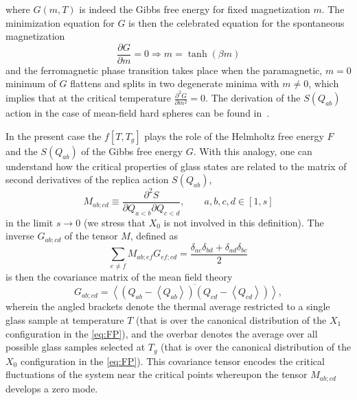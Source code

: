 \documentclass[aps,pnas,float]{revtex4}
\begin{document}
where $G(m,T)$ is indeed the Gibbs free energy for fixed magnetization $m$. The minimization equation for $G$ is then the celebrated equation for the spontaneous magnetization
\begin{equation}
 \frac{\partial G}{\partial m} = 0 \Longrightarrow m = \tanh(\beta m)
\end{equation}
and the ferromagnetic phase transition takes place when the paramagnetic, $m=0$ minimum of $G$ flattens and splits in two degenerate minima with $m\neq 0$, which implies that at the critical temperature $\frac{\partial^2 G}{\partial m^2} = 0$. The derivation of the $S(Q_{ab})$ action in the case of mean-field hard spheres can be found in~\cite{KPZ12}.

In the present case the $f[T,T_g]$ plays the role of the Helmholtz free energy $F$ and the $S(Q_{ab})$ of the Gibbs free energy $G$. With this analogy, one can understand how the critical properties of glass states are related to the matrix of second derivatives of the replica action $S(Q_{ab})$,
\begin{equation}
 M_{ab;cd} \equiv \frac{\partial^2 S}{\partial Q_{a<b}\partial Q_{c<d}},\qquad a,b,c,d \in [1,s]
\end{equation}
in the limit $s \to 0$ (we stress that $X_0$ is not involved in this definition). The inverse $G_{ab;cd}$ of the tensor $M$, defined as
\begin{equation}
\sum_{e\neq f} M_{ab;ef}G_{ef;cd} = \frac{\delta_{ac}\delta_{bd} + \delta_{ad}\delta_{bc}}{2}
\end{equation}
is then the covariance matrix of the mean field theory
\begin{equation}
 G_{ab;cd} = \overline{\left<(Q_{ab}-\left<Q_{ab}\right>)(Q_{cd}-\left<Q_{cd}\right>)\right>},
\end{equation}
wherein the angled brackets denote the thermal average restricted to a single glass sample at temperature $T$ (that is over the canonical distribution of the $X_1$ configuration in the \eqref{eq:FP}), and the overbar denotes the average over all possible glass samples selected at $T_g$ (that is over the canonical distribution of the $X_0$ configuration in the \eqref{eq:FP}). This covariance tensor encodes the critical fluctuations of the system near the critical points whereupon the tensor $M_{ab;cd}$ develops a zero mode.
\end{document}
